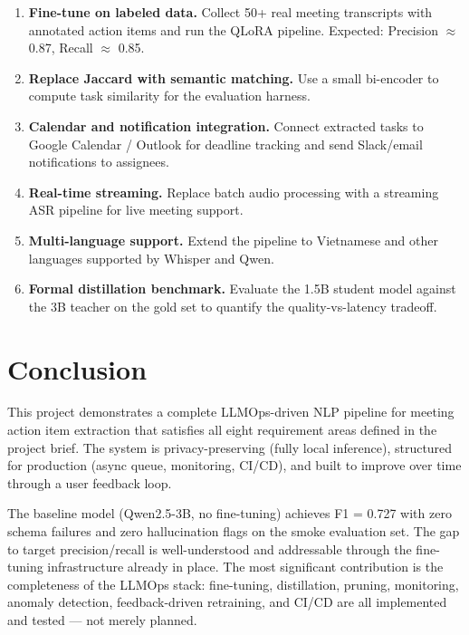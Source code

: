 \documentclass[12pt,a4paper]{article}
\begin{document}
\begin{enumerate}
    \item \textbf{Fine-tune on labeled data.} Collect 50+ real meeting transcripts with annotated action items and run the QLoRA pipeline. Expected: Precision $\approx$ 0.87, Recall $\approx$ 0.85.
    \item \textbf{Replace Jaccard with semantic matching.} Use a small bi-encoder to compute task similarity for the evaluation harness.
    \item \textbf{Calendar and notification integration.} Connect extracted tasks to Google Calendar / Outlook for deadline tracking and send Slack/email notifications to assignees.
    \item \textbf{Real-time streaming.} Replace batch audio processing with a streaming ASR pipeline for live meeting support.
    \item \textbf{Multi-language support.} Extend the pipeline to Vietnamese and other languages supported by Whisper and Qwen.
    \item \textbf{Formal distillation benchmark.} Evaluate the 1.5B student model against the 3B teacher on the gold set to quantify the quality-vs-latency tradeoff.
\end{enumerate}

\section{Conclusion}

This project demonstrates a complete LLMOps-driven NLP pipeline for meeting action item extraction that satisfies all eight requirement areas defined in the project brief. The system is privacy-preserving (fully local inference), structured for production (async queue, monitoring, CI/CD), and built to improve over time through a user feedback loop.

The baseline model (Qwen2.5-3B, no fine-tuning) achieves F1 = 0.727 with zero schema failures and zero hallucination flags on the smoke evaluation set. The gap to target precision/recall is well-understood and addressable through the fine-tuning infrastructure already in place. The most significant contribution is the completeness of the LLMOps stack: fine-tuning, distillation, pruning, monitoring, anomaly detection, feedback-driven retraining, and CI/CD are all implemented and tested — not merely planned.
\end{document}
